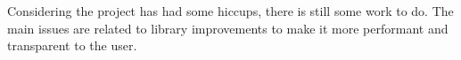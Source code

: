 
Considering the project has had some hiccups, there is still some work to do. The main issues are related to library improvements to make it more performant and transparent to the user.
